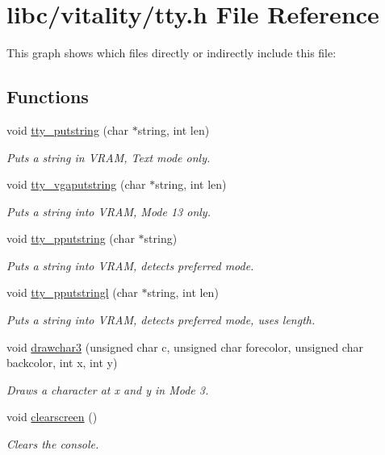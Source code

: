 \hypertarget{a00143}{}\section{libc/vitality/tty.h File Reference}
\label{a00143}
This graph shows which files directly or indirectly include this file\+:
\subsection*{Functions}
\begin{DoxyCompactItemize}
\item 
void \hyperlink{a00143_a5b5bf610a57f3c59b2851fa2652081ec_a5b5bf610a57f3c59b2851fa2652081ec}{tty\+\_\+putstring} (char $\ast$string, int len)
\begin{DoxyCompactList}\small\item\em Puts a string in V\+R\+AM, Text mode only. \end{DoxyCompactList}\item 
void \hyperlink{a00143_a05ca3f5e64f38fec173b635ca8465415_a05ca3f5e64f38fec173b635ca8465415}{tty\+\_\+vgaputstring} (char $\ast$string, int len)
\begin{DoxyCompactList}\small\item\em Puts a string into V\+R\+AM, Mode 13 only. \end{DoxyCompactList}\item 
void \hyperlink{a00143_ade960b1320324706aac6c00cc6b1b2fe_ade960b1320324706aac6c00cc6b1b2fe}{tty\+\_\+pputstring} (char $\ast$string)
\begin{DoxyCompactList}\small\item\em Puts a string into V\+R\+AM, detects preferred mode. \end{DoxyCompactList}\item 
void \hyperlink{a00143_abaf93f9e56ddb7b10462070f59e534e4_abaf93f9e56ddb7b10462070f59e534e4}{tty\+\_\+pputstringl} (char $\ast$string, int len)
\begin{DoxyCompactList}\small\item\em Puts a string into V\+R\+AM, detects preferred mode, uses length. \end{DoxyCompactList}\item 
void \hyperlink{a00143_a6215de17c731a2ff0d61587c39b15375_a6215de17c731a2ff0d61587c39b15375}{drawchar3} (unsigned char c, unsigned char forecolor, unsigned char backcolor, int x, int y)
\begin{DoxyCompactList}\small\item\em Draws a character at x and y in Mode 3. \end{DoxyCompactList}\item 
void \hyperlink{a00143_aff4bc17c602603d120756f52e18ebb96_aff4bc17c602603d120756f52e18ebb96}{clearscreen} ()
\begin{DoxyCompactList}\small\item\em Clears the console. \end{DoxyCompactList}\end{DoxyCompactItemize}


